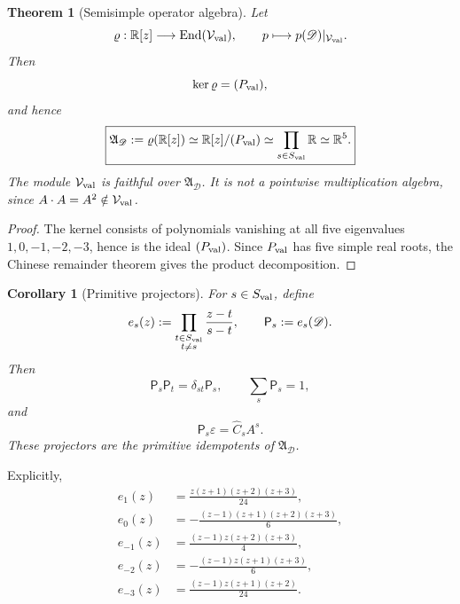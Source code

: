 \documentclass[aps,prd,reprint,onecolumn,nofootinbib,superscriptaddress,showkeys]{revtex4-2}
\numberwithin{equation}{section}
\theoremstyle{definition}
\theoremstyle{plain}
\newtheorem{theorem}{Theorem}[section]
\newtheorem{corollary}{Corollary}[section]
\newcommand{\R}{\mathbb R}
\newcommand{\Dil}{\mathscr D}
\begin{document}
\begin{theorem}[Semisimple operator algebra]
Let
\begin{equation}
\varrho:\R[z]\longrightarrow\operatorname{End}(\mathcal V_{\rm val}),
\qquad
p\longmapsto p(\Dil)|_{\mathcal V_{\rm val}}.
\end{equation}
Then
\begin{equation}
\ker\varrho=(P_{\rm val}),
\end{equation}
and hence
\begin{equation}
\boxed{
\mathfrak A_{\Dil}
:=
\varrho(\R[z])
\simeq
\R[z]/(P_{\rm val})
\simeq
\prod_{s\in S_{\rm val}}\R
\simeq
\R^5.
}
\end{equation}
The module \(\mathcal V_{\rm val}\) is faithful over \(\mathfrak A_{\Dil}\).  It is not a pointwise multiplication algebra, since \(A\cdot A=A^2\notin\mathcal V_{\rm val}\).
\end{theorem}

\begin{proof}
The kernel consists of polynomials vanishing at all five eigenvalues \(1,0,-1,-2,-3\), hence is the ideal \((P_{\rm val})\).  Since \(P_{\rm val}\) has five simple real roots, the Chinese remainder theorem gives the product decomposition.
\end{proof}

\begin{corollary}[Primitive projectors]
For \(s\in S_{\rm val}\), define
\begin{equation}
e_s(z):=
\prod_{\substack{t\in S_{\rm val}\\t\ne s}}
\frac{z-t}{s-t},
\qquad
\mathsf P_s:=e_s(\Dil).
\end{equation}
Then
\begin{equation}
\mathsf P_s\mathsf P_t=\delta_{st}\mathsf P_s,
\qquad
\sum_s\mathsf P_s=1,
\end{equation}
and
\begin{equation}
\mathsf P_s\varepsilon=\widehat C_sA^s.
\end{equation}
These projectors are the primitive idempotents of \(\mathfrak A_{\Dil}\).
\end{corollary}

Explicitly,
\begin{align}
e_1(z)&=\frac{z(z+1)(z+2)(z+3)}{24},\\
e_0(z)&=-\frac{(z-1)(z+1)(z+2)(z+3)}{6},\\
e_{-1}(z)&=\frac{(z-1)z(z+2)(z+3)}{4},\\
e_{-2}(z)&=-\frac{(z-1)z(z+1)(z+3)}{6},\\
e_{-3}(z)&=\frac{(z-1)z(z+1)(z+2)}{24}.
\end{align}
\end{document}
